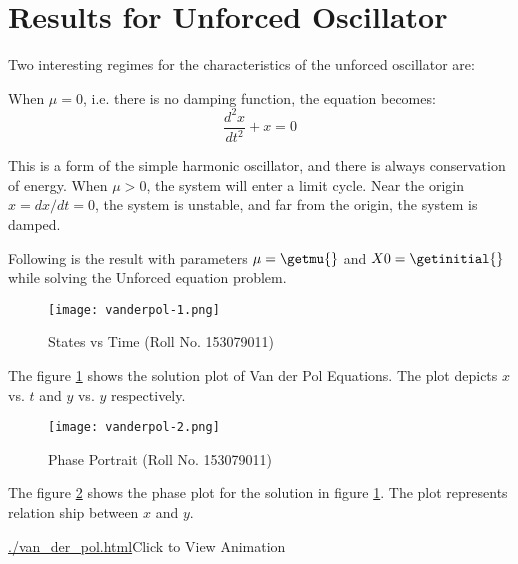 \documentclass[12pt, a4paper]{article}
\begin{document}
\section{Results for Unforced Oscillator}
Two interesting regimes for the characteristics of the unforced oscillator are:

When $\mu = 0$, i.e. there is no damping function, the equation becomes:
\begin{equation} \label{simple}
\frac{d^2x}{dt^2} + x = 0
\end{equation}

This is a form of the simple harmonic oscillator, and there is always conservation of energy.
When $\mu > 0$, the system will enter a limit cycle. Near the origin $x = dx/dt = 0$, the system is unstable, and far from the origin, the system is damped.

Following is the result with parameters $\mu = \getmu{}$ and $X0 = \getinitial{}$ while solving the Unforced equation problem.
\begin{figure}[H]
\centering
\texttt{[image: vanderpol-1.png]}
\caption{States vs Time (Roll No. 153079011)}
\label{fig:states}
\end{figure}

The figure \ref{fig:states} shows the solution plot of Van der Pol Equations. The plot depicts $x$ vs. $t$ and $y$ vs. $y$ respectively.

\begin{figure}[H]
\centering
\texttt{[image: vanderpol-2.png]}
\caption{Phase Portrait (Roll No. 153079011)}
\label{fig:phase}
\end{figure}

The figure \ref{fig:phase} shows the phase plot for the solution in figure \ref{fig:states}. The plot represents relation ship between $x$ and $y$.

\url{./van_der_pol.html}{Click to View Animation}



\end{document}

